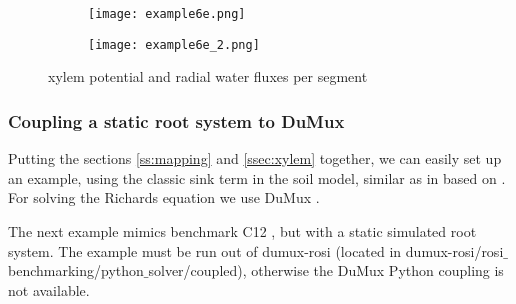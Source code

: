\begin{figure}
\begin{subfigure}[c]{0.5\textwidth}
\texttt{[image: example6e.png]}
 \label{fig:stomata}
\end{subfigure}
\begin{subfigure}[c]{0.5\textwidth}
\texttt{[image: example6e\_2.png]}
 \label{fig:stomatb}
\end{subfigure}
\caption{xylem potential and radial water fluxes per segment} 
\end{figure}

\subsubsection*{Coupling a static root system to DuMux} \label{sec:dumux_coupling}

Putting the sections \ref{ss:mapping} and \ref{ssec:xylem} together, we can easily set up an example, using the classic sink term in the soil model, similar as in \citep{leitner2014impact} based on \citep{doussan1998modelling}. For solving the Richards equation we use DuMux \citep{koch2020dumux}.

The next example mimics benchmark C12 \citep{schnepf2019call}, but with a static simulated root system. The example must be run out of dumux-rosi (located in dumux-rosi/rosi$\_$benchmarking/python$\_$solver/coupled), otherwise the DuMux Python coupling is not available. 



